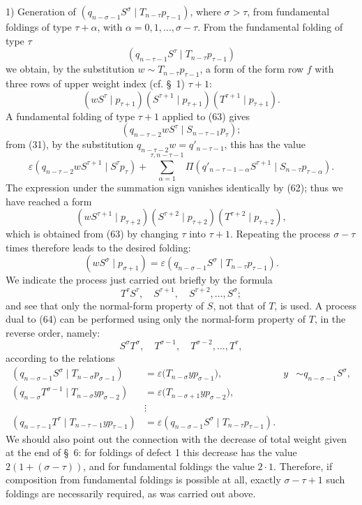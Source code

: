 \documentclass[10pt]{article}
\newcommand{\pair}[2]{(#1\mid #2)}
\newcommand{\eps}{\varepsilon}
\begin{document}
1) Generation of
$\pair{q_{n-\sigma-1}S^\sigma}{T_{n-\tau}p_{\tau-1}}$, where
$\sigma>\tau$, from fundamental foldings of type $\tau+\alpha$, with
$\alpha=0,1,\ldots,\sigma-\tau$. From the fundamental folding of type
$\tau$
\[
 \pair{q_{n-\tau-1}S^\tau}{T_{n-\tau}p_{\tau-1}}
\]
we obtain, by the substitution $w\sim T_{n-\tau}p_{\tau-1}$, a form of the
form row $f$ with three rows of upper weight index (cf. \S\ 1) $\tau+1$:
\begin{equation}
 \pair{wS^\tau}{p_{\tau+1}}
 \pair{S^{\tau+1}}{p_{\tau+1}}
 \pair{T^{\tau+1}}{p_{\tau+1}}.
\tag{63}
\end{equation}
A fundamental folding of type $\tau+1$ applied to (63) gives
\[
 \pair{q_{n-\tau-2}wS^\tau}{S_{n-\tau-1}p_\tau};
\]
from (31), by the substitution $q_{n-\tau-2}w=q'_{n-\tau-1}$, this has the
value
\[
 \eps\pair{q_{n-\tau-2}wS^{\tau+1}}{S^\tau p_\tau}
 +\sum_{\alpha=1}^{\tau,n-\tau-1}\Pi
 \pair{q'_{n-\tau-1-\alpha}S^{\tau+1}}
 {S_{n-\tau}p_{\tau-\alpha}}.
\]
The expression under the summation sign vanishes identically by (62); thus
we have reached a form
\[
 \pair{wS^{\tau+1}}{p_{\tau+2}}
 \pair{S^{\tau+2}}{p_{\tau+2}}
 \pair{T^{\tau+2}}{p_{\tau+2}},
\]
which is obtained from (63) by changing $\tau$ into $\tau+1$. Repeating the
process $\sigma-\tau$ times therefore leads to the desired folding:
\[
 \pair{wS^\sigma}{p_{\sigma+1}}
 =\eps\pair{q_{n-\sigma-1}S^\sigma}{T_{n-\tau}p_{\tau-1}}.
\]
We indicate the process just carried out briefly by the formula
\begin{equation}
 T^\tau S^\tau,\quad S^{\tau+1},\quad S^{\tau+2},\ldots,S^\sigma;
\tag{64}
\end{equation}
and see that only the normal-form property of $S$, not that of $T$, is used.
A process dual to (64) can be performed using only the normal-form property
of $T$, in the reverse order, namely:
\begin{equation}
 S^\sigma T^\sigma,\quad T^{\sigma-1},\quad T^{\sigma-2},\ldots,T^\tau,
\tag{65}
\end{equation}
according to the relations
\begin{align*}
\pair{q_{n-\sigma-1}S^\sigma}{T_{n-\sigma}p_{\sigma-1}}
 &=\eps\bigl(T_{n-\sigma}y p_{\sigma-1}\bigr),
 & y&\sim q_{n-\sigma-1}S^\sigma,\\
\pair{q_{n-\sigma}T^{\sigma-1}}{T_{n-\sigma}yp_{\sigma-2}}
 &=\eps\bigl(T_{n-\sigma+1}y p_{\sigma-2}\bigr),\\
&\vdots\\
\pair{q_{n-\tau-1}T^\tau}{T_{n-\tau-1}yp_{\tau-1}}
 &=\eps\pair{q_{n-\sigma-1}S^\sigma}{T_{n-\tau}p_{\tau-1}}.
\end{align*}
We should also point out the connection with the decrease of total weight
given at the end of \S\ 6: for foldings of defect 1 this decrease has the
value $2(1+(\sigma-\tau))$, and for fundamental foldings the value
$2\cdot1$. Therefore, if composition from fundamental foldings is possible
at all, exactly $\sigma-\tau+1$ such foldings are necessarily required, as
was carried out above.
\end{document}
